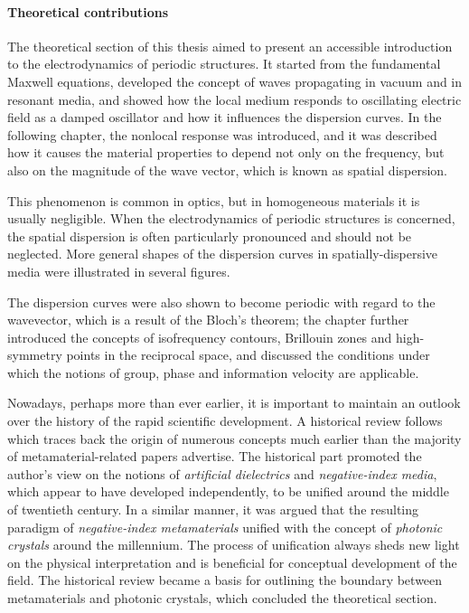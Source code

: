 \paragraph{Theoretical contributions}
The theoretical section of this thesis aimed to present an accessible introduction to the electrodynamics of periodic structures. It started from the fundamental Maxwell equations, developed the concept of waves propagating in vacuum and in resonant media, and showed how the local medium responds to oscillating electric field as a damped oscillator and how it influences the dispersion curves. In the following chapter, the nonlocal response was introduced, and it was described how it causes the material properties to depend not only on the frequency, but also on the magnitude of the wave vector, which is known as spatial dispersion. 

This phenomenon is common in optics, but in homogeneous materials it is usually negligible. When the electrodynamics of periodic structures is concerned, the spatial dispersion is often particularly pronounced and should not be neglected. More general shapes of the dispersion curves in spatially-dispersive media were illustrated in several figures. 

The dispersion curves were also shown to become periodic with regard to the wavevector, which is a result of the Bloch's theorem; the chapter further introduced the concepts of isofrequency contours, Brillouin zones and high-symmetry points in the reciprocal space, and discussed the conditions under which the notions of group, phase and information velocity are applicable.

Nowadays, perhaps more than ever earlier, it is important to maintain an outlook over the history of the rapid scientific development. A  historical review follows which traces back the origin of numerous concepts much earlier than the majority of metamaterial-related papers advertise. %
The historical part promoted the author's view on the notions of \textit{artificial dielectrics} and \textit{negative-index media}, which appear to have developed independently, to be unified around the middle of twentieth century. In a similar manner, it was argued that the resulting paradigm of \textit{negative-index metamaterials} unified with the concept of \textit{photonic crystals} around the millennium. The process of unification always sheds new light on the physical interpretation and is beneficial for conceptual development of the field. The historical review became a basis for outlining the boundary between metamaterials and photonic crystals, which concluded the theoretical section.

